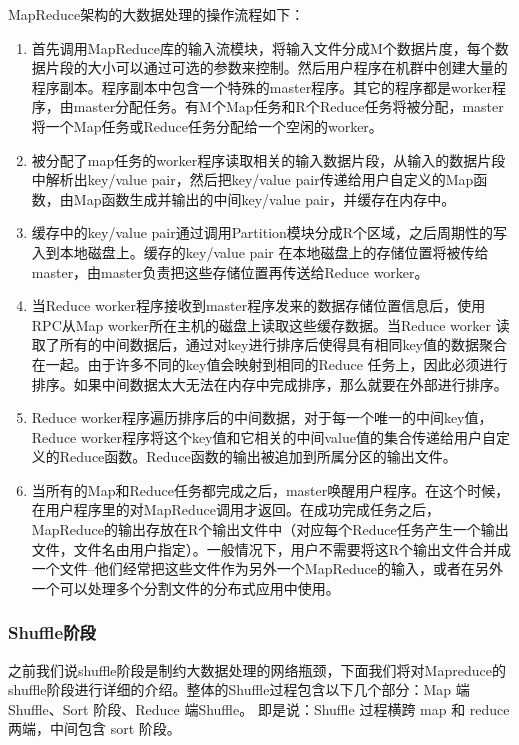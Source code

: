 \documentclass[a4paper, 11pt]{article}                                                   %
\begin{document}
\begin{CJK*}{UTF8}{song}
\vspace{1.5em}
MapReduce架构的大数据处理的操作流程如下：
\begin{enumerate}
  \item 首先调用MapReduce库的输入流模块，将输入文件分成M个数据片度，每个数据片段的大小可以通过可选的参数来控制。然后用户程序在机群中创建大量的程序副本。程序副本中包含一个特殊的master程序。其它的程序都是worker程序，由master分配任务。有M个Map任务和R个Reduce任务将被分配，master将一个Map任务或Reduce任务分配给一个空闲的worker。
  \item 被分配了map任务的worker程序读取相关的输入数据片段，从输入的数据片段中解析出key/value pair，然后把key/value pair传递给用户自定义的Map函数，由Map函数生成并输出的中间key/value pair，并缓存在内存中。
  \item 缓存中的key/value pair通过调用Partition模块分成R个区域，之后周期性的写入到本地磁盘上。缓存的key/value pair 在本地磁盘上的存储位置将被传给master，由master负责把这些存储位置再传送给Reduce worker。
  \item 当Reduce worker程序接收到master程序发来的数据存储位置信息后，使用RPC从Map worker所在主机的磁盘上读取这些缓存数据。当Reduce worker 读取了所有的中间数据后，通过对key进行排序后使得具有相同key值的数据聚合在一起。由于许多不同的key值会映射到相同的Reduce 任务上，因此必须进行排序。如果中间数据太大无法在内存中完成排序，那么就要在外部进行排序。
  \item Reduce worker程序遍历排序后的中间数据，对于每一个唯一的中间key值，Reduce worker程序将这个key值和它相关的中间value值的集合传递给用户自定义的Reduce函数。Reduce函数的输出被追加到所属分区的输出文件。
  \item 当所有的Map和Reduce任务都完成之后，master唤醒用户程序。在这个时候，在用户程序里的对MapReduce调用才返回。在成功完成任务之后，MapReduce的输出存放在R个输出文件中（对应每个Reduce任务产生一个输出文件，文件名由用户指定）。一般情况下，用户不需要将这R个输出文件合并成一个文件–他们经常把这些文件作为另外一个MapReduce的输入，或者在另外一个可以处理多个分割文件的分布式应用中使用。
\end{enumerate}

\subsubsection{Shuffle阶段}
之前我们说shuffle阶段是制约大数据处理的网络瓶颈，下面我们将对Mapreduce的shuffle阶段进行详细的介绍。整体的Shuffle过程包含以下几个部分：Map 端Shuffle、Sort 阶段、Reduce 端Shuffle。 即是说：Shuffle 过程横跨 map 和 reduce 两端，中间包含 sort 阶段。


\end{CJK*}
\end{document}

